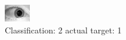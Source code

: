 \begin{figure}[h!]
\begin{center}
\includegraphics[width=0.60\columnwidth]{figures/ID1583_class_2_target_1.png}
\end{center}
\caption{ Classification: 2 actual target: 1}
\label{fig:ID1583_class_2_target_1}
\end{figure}
